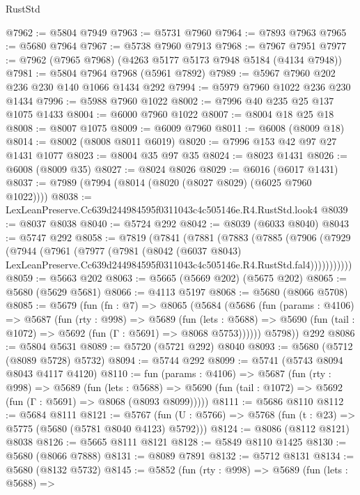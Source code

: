 \begin{lexlean}{RustStd}
\begin{coremodule}
@7962 := @5804 @7949
@7963 := @5731 @7960
@7964 := @7893 @7963
@7965 := @5680 @7964
@7967 := @5738 @7960 @7913
@7968 := @7967 @7951
@7977 := @7962 (@7965 @7968) (@4263 @5177 @5173 @7948 @5184 (@4134 @7948))
@7981 := @5804 @7964 @7968 (@5961 @7892)
@7989 := @5967 @7960 @202 @236 @230 @140 @1066 @1434 @292
@7994 := @5979 @7960 @1022 @236 @230 @1434
@7996 := @5988 @7960 @1022
@8002 := @7996 @40 @235 @25 @137 @1075 @1433
@8004 := @6000 @7960 @1022
@8007 := @8004 @18 @25 @18
@8008 := @8007 @1075
@8009 := @6009 @7960
@8011 := @6008 (@8009 @18)
@8014 := @8002 (@8008 @8011 @6019)
@8020 := @7996 @153 @42 @97 @27 @1431 @1077
@8023 := @8004 @35 @97 @35
@8024 := @8023 @1431
@8026 := @6008 (@8009 @35)
@8027 := @8024 @8026
@8029 := @6016 (@6017 @1431)
@8037 := @7989 (@7994 (@8014 (@8020 (@8027 @8029) (@6025 @7960 @1022))))
@8038 := LexLeanPreserve.Cc639d244984595f0311043c4c505146e.R4.RustStd.look4
@8039 := @8037 @8038
@8040 := @5724 @292
@8042 := @8039 (@6033 @8040)
@8043 := @5747 @292
@8058 := @7819
    (@7841
      (@7881
        (@7883
          (@7885
            (@7906
              (@7929
                (@7944
                  (@7961
                    (@7977
                      (@7981
                        (@8042
                          (@6037 @8043)
                          LexLeanPreserve.Cc639d244984595f0311043c4c505146e.R4.RustStd.fal4)))))))))))
@8059 := @5663 @202
@8063 := @5665 (@5669 @202) (@5675 @202)
@8065 := @5680 (@5629 @5681)
@8066 := @4113 @5197
@8068 := @5680 (@8066 @5708)
@8085 := @5679
    (fun (fn : @7) =>
    @8065
      (@5684
        (@5686
          (fun (params : @4106) =>
          @5687
            (fun (rty : @998) =>
            @5689
              (fun (lets : @5688) =>
              @5690 (fun (tail : @1072) => @5692 (fun (Γ : @5691) => @8068 @5753))))))
        @5798))
    @292
@8086 := @5804 @5631
@8089 := @5720 (@5721 @292) @8040
@8093 := @5680 (@5712 (@8089 @5728) @5732)
@8094 := @5744 @292
@8099 := @5741 (@5743 @8094 @8043 @4117 @4120)
@8110 := fun (params : @4106) =>
  @5687
    (fun (rty : @998) =>
    @5689
      (fun (lets : @5688) =>
      @5690 (fun (tail : @1072) => @5692 (fun (Γ : @5691) => @8068 (@8093 @8099)))))
@8111 := @5686 @8110
@8112 := @5684 @8111
@8121 := @5767 (fun (U : @5766) => @5768 (fun (t : @23) => @5775 (@5680 (@5781 @8040 @4123) @5792)))
@8124 := @8086 (@8112 @8121) @8038
@8126 := @5665 @8111 @8121
@8128 := @5849 @8110 @1425
@8130 := @5680 (@8066 @7888)
@8131 := @8089 @7891
@8132 := @5712 @8131
@8134 := @5680 (@8132 @5732)
@8145 := @5852
    (fun (rty : @998) =>
    @5689
      (fun (lets : @5688) =>

\end{coremodule}
\end{lexlean}
